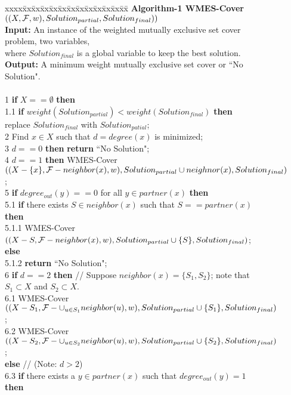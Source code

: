 \documentclass[11pt]{article}
\begin{document}
\begin{figure}[htb]
\footnotesize
\begin{tabbing}
xxxx\=xx\=xx\=xx\=xx\=xx\=xx\=xx\=xx\=xx\=xx\=xx\=xx\=\kill
{\bf Algorithm-1 WMES-Cover$((X,{\cal F},w), Solution_{partial}, Solution_{final}))$}\\
\textbf{Input:} An instance of the {\sc weighted mutually exclusive set cover} problem, two variables,\\
\>\>\> where $Solution_{final}$ is a global variable to keep the
best solution.\\
\textbf{Output:} A minimum weight mutually exclusive set cover or ``No Solution".\\
\\

1 \> {\bf if} $X==\emptyset$ {\bf then}\\
1.1 \>\> {\bf if} $weight(Solution_{partial})<weight(Solution_{final})$ {\bf then} replace $Solution_{final}$ with $Solution_{patial}$;\\
2 \>Find $x \in X$ such that $d=degree(x)$ is minimized;\\
3  $d==0$ {\bf then} {\bf return} ``No Solution";\\
4  $d==1$ {\bf then} WMES-Cover$((X-\{x\},{\cal
F}-neighbor(x),w),Solution_{partial}\cup neighnor(x),
Solution_{final})$;\\
5 \> {\bf if} $degree_{out}(y)==0$ for all $y \in partner(x)$ {\bf
then}\\
5.1 \>\> {\bf if} there exists $S \in neighbor(x)$ such that
$S==partner(x)$ {\bf then}\\
5.1.1 \>\>\> WMES-Cover$((X-S,{\cal
F}-neighbor(x),w),Solution_{partial}\cup
\{S\}, Solution_{final})$;\\
 \>\> {\bf else}\\
5.1.2 \>\>\> {\bf return} ``No Solution";\\
6 \> {\bf if} $d==2$ {\bf then} // Suppose $neighbor(x)=\{S_1,S_2\}$; note that $S_1\subset X$ and $S_2\subset X$.\\
6.1 \>\> WMES-Cover$((X-S_1,{\cal F}-\cup_{u \in
S_1}neighbor(u),w),Solution_{partial}\cup
\{S_1\}, Solution_{final})$;\\
6.2 \>\> WMES-Cover$((X-S_2,{\cal F}-\cup_{u \in
S_2}neighbor(u),w),Solution_{partial}\cup
\{S_2\}, Solution_{final})$;\\
 \> {\bf else} // (Note: $d>2$)\\
6.3 \>\> {\bf if} there exists a $y \in
partner(x)$ such that $degree_{out}(y) =  1$ {\bf then}\\

\end{tabbing}
\end{figure}
\end{document}
